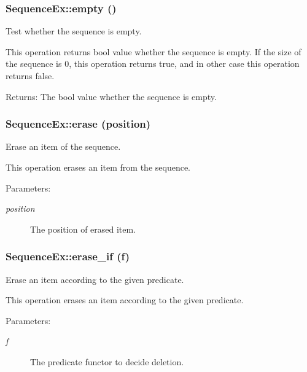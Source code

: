 \subsubsection{\setlength{\rightskip}{0pt plus 5cm}Sequence\-Ex::empty ()}\label{classSequenceEx_SequenceExa4}


Test whether the sequence is empty. 

This operation returns bool value whether the sequence is empty. If the size of the sequence is 0, this operation returns true, and in other case this operation returns false. \begin{Desc}
\item[Returns:]The bool value whether the sequence is empty.\end{Desc}
\subsubsection{\setlength{\rightskip}{0pt plus 5cm}Sequence\-Ex::erase (position)}\label{classSequenceEx_SequenceExa7}


Erase an item of the sequence. 

This operation erases an item from the sequence. \begin{Desc}
\item[Parameters:]
\begin{description}
\item[{\em position}]The position of erased item.\end{description}
\end{Desc}
\subsubsection{\setlength{\rightskip}{0pt plus 5cm}Sequence\-Ex::erase\_\-if (f)}\label{classSequenceEx_SequenceExa8}


Erase an item according to the given predicate. 

This operation erases an item according to the given predicate. \begin{Desc}
\item[Parameters:]
\begin{description}
\item[{\em f}]The predicate functor to decide deletion.\end{description}
\end{Desc}
